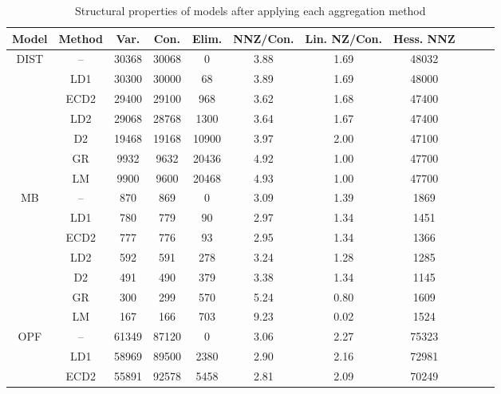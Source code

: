 \documentclass[smallextended]{svjour3}
\begin{document}
\begin{table}[]
    \centering
    \caption{Structural properties of models after applying each aggregation method}
    \vspace{0.2cm}
    \begin{tabular}{ccccccccccc}
      \toprule
Model     & Method    & Var.   & Con.   & Elim. & NNZ/Con. & Lin. NZ/Con. & Hess. NNZ\\
\midrule
\multirow{7}{*}{DIST} & --        &  30368 &  30068 &     0 & 3.88 & 1.69 &  48032\\
                      & LD1       &  30300 &  30000 &    68 & 3.89 & 1.69 &  48000\\
                      & ECD2      &  29400 &  29100 &   968 & 3.62 & 1.68 &  47400\\
                      & LD2       &  29068 &  28768 &  1300 & 3.64 & 1.67 &  47400\\
                      & D2        &  19468 &  19168 & 10900 & 3.97 & 2.00 &  47100\\
                      & GR        &   9932 &   9632 & 20436 & 4.92 & 1.00 &  47700\\
                      & LM        &   9900 &   9600 & 20468 & 4.93 & 1.00 &  47700\\
\midrule
\multirow{7}{*}{MB}   & --        &    870 &    869 &     0 & 3.09 & 1.39 &   1869\\
                      & LD1       &    780 &    779 &    90 & 2.97 & 1.34 &   1451\\
                      & ECD2      &    777 &    776 &    93 & 2.95 & 1.34 &   1366\\
                      & LD2       &    592 &    591 &   278 & 3.24 & 1.28 &   1285\\
                      & D2        &    491 &    490 &   379 & 3.38 & 1.34 &   1145\\
                      & GR        &    300 &    299 &   570 & 5.24 & 0.80 &   1609\\
                      & LM        &    167 &    166 &   703 & 9.23 & 0.02 &   1524\\
\midrule
\multirow{7}{*}{OPF}  & --        &  61349 &  87120 &     0 & 3.06 & 2.27 &  75323\\
                      & LD1       &  58969 &  89500 &  2380 & 2.90 & 2.16 &  72981\\
                      & ECD2      &  55891 &  92578 &  5458 & 2.81 & 2.09 &  70249\\

\end{tabular}
\end{table}
\end{document}
